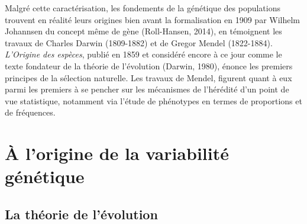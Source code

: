 \documentclass[12pt,a4paper,twoside]{ugathesis}
\theoremstyle{definition}
\theoremstyle{definition}
\theoremstyle{remark}
\begin{document}
Malgré cette caractérisation, les fondements de la génétique des
populations trouvent en réalité leurs origines bien avant la
formalisation en 1909 par Wilhelm Johannsen du concept même de gène
(Roll-Hansen, 2014), en témoignent les travaux de Charles Darwin
(1809-1882) et de Gregor Mendel (1822-1884). \emph{L'Origine des
espèces}, publié en 1859 et considéré encore à ce jour comme le texte
fondateur de la théorie de l'évolution (Darwin, 1980), énonce les
premiers principes de la sélection naturelle. Les travaux de Mendel,
figurent quant à eux parmi les premiers à se pencher sur les mécanismes
de l'hérédité d'un point de vue statistique, notamment via l'étude de
phénotypes en termes de proportions et de fréquences.

\section{À l'origine de la variabilité
génétique}\label{a-lorigine-de-la-variabilite-genetique}

\subsection{La théorie de l'évolution}\label{la-theorie-de-levolution}
\end{document}
